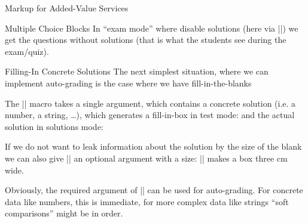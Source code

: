 \begin{sfragment}{Markup for Added-Value Services}
\begin{sfragment}{Multiple Choice Blocks}
In ``exam mode'' where disable solutions (here via |\stopsolutions|)
we get the questions without solutions (that is what the students see during the
exam/quiz).
\end{sfragment}

\begin{sfragment}{Filling-In Concrete Solutions}
The next simplest situation, where we can implement auto-grading is the case where we
have fill-in-the-blanks 

\begin{function}{\fillinsol}
  The |\fillinsol| macro takes a single argument, which contains a concrete solution
  (i.e. a number, a string, \ldots), which generates a fill-in-box in test mode:
 and the actual solution in solutions mode:   
\end{function}
If we do not want to leak information about the solution by the size of the blank we can
also give |\fillinsol| an optional argument with a size: || makes a box
 three cm wide. 

 Obviously, the required argument of |\fillinsol| can be used for auto-grading. For
 concrete data like numbers, this is immediate, for more complex data like strings ``soft
 comparisons'' might be in order. 
\end{sfragment}
\end{sfragment}

